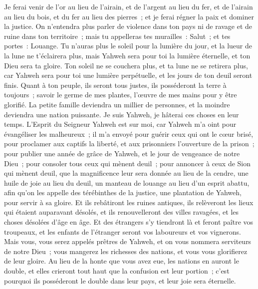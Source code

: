 \begin{multicols}{2}
Je ferai venir de l'or au lieu de l'airain, et de l'argent au lieu du fer, et de l'airain au lieu du bois, et du fer au lieu des pierres~; et je ferai régner la paix et dominer la justice.
On n'entendra plus parler de violence dans ton pays ni de ravage et de ruine dans ton territoire~; mais tu appelleras tes murailles~: Salut~; et tes portes~: Louange.
Tu n'auras plus le soleil pour la lumière du jour, et la lueur de la lune ne t'éclairera plus, mais Yahweh sera pour toi la lumière éternelle, et ton Dieu sera ta gloire.
Ton soleil ne se couchera plus, et ta lune ne se retirera plus, car Yahweh sera pour toi une lumière perpétuelle, et les jours de ton deuil seront finis.
Quant à ton peuple, ils seront tous justes, ils posséderont la terre à toujours~; savoir le germe de mes plantes, l'œuvre de mes mains pour y être glorifié.
La petite famille deviendra un millier de personnes, et la moindre deviendra une nation puissante. Je suis Yahweh, je hâterai ces choses en leur temps.
\VerseOne{}L'Esprit du Seigneur Yahweh est sur moi, car Yahweh m'a oint pour évangéliser les malheureux~; il m'a envoyé pour guérir ceux qui ont le cœur brisé, pour proclamer aux captifs la liberté, et aux prisonniers l'ouverture de la prison~;
pour publier une année de grâce de Yahweh, et le jour de vengeance de notre Dieu~; pour consoler tous ceux qui mènent deuil~;
pour annoncer à ceux de Sion qui mènent deuil, que la magnificence leur sera donnée au lieu de la cendre, une huile de joie au lieu du deuil, un manteau de louange au lieu d'un esprit abattu, afin qu'on les appelle des térébinthes de la justice, une plantation de Yahweh, pour servir à sa gloire.
Et ils rebâtiront les ruines antiques, ils relèveront les lieux qui étaient auparavant désolés, et ils renouvelleront des villes ravagées, et les choses désolées d'âge en âge.
Et des étrangers s'y tiendront là et feront paître vos troupeaux, et les enfants de l'étranger seront vos laboureurs et vos vignerons.
Mais vous, vous serez appelés prêtres de Yahweh, et on vous nommera serviteurs de notre Dieu~; vous mangerez les richesses des nations, et vous vous glorifierez de leur gloire.
Au lieu de la honte que vous avez eue, les nations en auront le double, et elles crieront tout haut que la confusion est leur portion~; c'est pourquoi ils posséderont le double dans leur pays, et leur joie sera éternelle.

\end{multicols}
